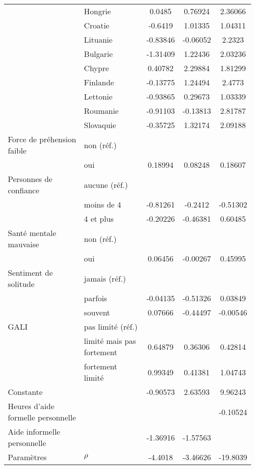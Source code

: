 \begin{Article}
\begin{refsection}[Bonnal]
\begin{table}
{\begin{tabular}{l@{\;}l@{\;} S!{\qquad}S!{\qquad}S!{\qquad}}
	& Hongrie & 0.0485 & 0.76924\sym{*} & 2.36066\sym{***} \\
	& Croatie & -0.6419 & 1.01335 & 1.04311 \\
	& Lituanie & -0.83846\sym{***} & -0.06052 & 2.2323\sym{***} \\
	& Bulgarie & -1.31409\sym{***} & 1.22436 & 2.03236\sym{***} \\
	& Chypre & 0.40782 & 2.29884\sym{***} & 1.81299\sym{***} \\
	& Finlande & -0.13775 & 1.24494\sym{**} & 2.4773\sym{***} \\
	& Lettonie & -0.93865\sym{**} & 0.29673 & 1.03339 \\
	& Roumanie & -0.91103\sym{**} & -0.13813 & 2.81787\sym{***} \\
	& Slovaquie & -0.35725 & 1.32174\sym{*} & 2.09188\sym{***} \\\hline
	Force de préhension faible & non (réf.) &\sym{}& \sym{}& \sym{} \\
	& oui & 0.18994\sym{*} & 0.08248 & 0.18607 \\\hline
	Personnes de confiance  & aucune (réf.) &\sym{}& \sym{}& \sym{} \\
	& moins de 4 & -0.81261\sym{**} & -0.2412 & -0.51302 \\
	& 4 et plus & -0.20226 & -0.46381 & 0.60485\sym{*} \\\hline
	Santé mentale mauvaise & non (réf.) & \sym{} & \sym{}& \sym{} \\
	& oui & 0.06456 & -0.00267 & 0.45995\sym{***} \\\hline
	Sentiment de solitude& jamais (réf.) &\sym{}& \sym{}&  \sym{}  \\
	& parfois & -0.04135 & -0.51326\sym{***} & 0.03849 \\
	& souvent & 0.07666 & -0.44497\sym{**} & -0.00546 \\\hline
	GALI & pas limité (réf.) & \sym{} & \sym{} & \sym{} \\
	& limité mais pas fortement & 0.64879\sym{***} & 0.36306 & 0.42814\sym{*} \\
	& fortement limité & 0.99349\sym{***} & 0.41381 & 1.04743\sym{***} \\\hline
	Constante & & -0.90573 & 2.63593\sym{**} & 9.96243 \\\hline\hline
	Heures d'aide formelle personnelle & & & & -0.10524\sym{***} \\
	Aide informelle personnelle & & -1.36916\sym{***} & -1.57563\sym{***} & \\\hline\hline
	Paramètres & $\rho$ & -4.4018\sym{***} & -3.46626\sym{***} & -19.8039\sym{***} \\

\end{tabular}}
\end{table}
\end{refsection}
\end{Article}
